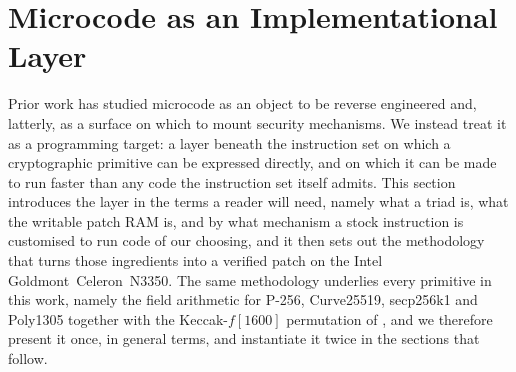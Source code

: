 %
%

\section{Microcode as an Implementational Layer}
\label{sec:ucode-layer}

Prior work has studied microcode as an object to be reverse engineered and,
latterly, as a surface on which to mount security mechanisms. We instead treat
it as a programming target: a layer beneath the instruction set on which a
cryptographic primitive can be expressed directly, and on which it can be made
to run faster than any code the instruction set itself admits. This section
introduces the layer in the terms a reader will need, namely what a triad is,
what the writable patch RAM is, and by what mechanism a stock instruction is
customised to run code of our choosing, and it then sets out the methodology
that turns those ingredients into a verified patch on the Intel
Goldmont~\hbox{Celeron~N3350}. The same methodology underlies every primitive
in this work, namely the field arithmetic for P-256, Curve25519, secp256k1 and
Poly1305 together with the Keccak-$f[1600]$ permutation of ,
and we therefore present it once, in general terms, and instantiate it twice in
the sections that follow.

